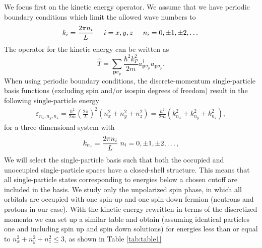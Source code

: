 We focus first on the kinetic energy operator.  We assume that we have
periodic boundary conditions which limit the allowed wave numbers to
\[
k_i=\frac{2\pi n_i}{L}\hspace{0.5cm} i=x,y,z \hspace{0.5cm} n_i=0,\pm
1,\pm 2, \dots
\]
The operator for the kinetic energy can be written as
\[
\hat{T}=\sum_{\mathbf{p}\sigma_p}\frac{\hbar^2k_P^2}{2m}a_{\mathbf{p}\sigma_p}^{\dagger}a_{\mathbf{p}\sigma_p}.
\]
When using periodic boundary conditions, the discrete-momentum
single-particle basis functions (excluding spin and/or isospin degrees
of freedom) result in the following single-particle energy
\begin{align}
  \varepsilon_{n_{x}, n_{y}, n_{z}} = \frac{\hbar^{2}}{2m} \left(
  \frac{2\pi }{L}\right)^{2} \left( n_{x}^{2} + n_{y}^{2} +
  n_{z}^{2}\right)=\frac{\hbar^2}{2m}\left(k_{n_x}^2+k_{n_y}^2+k_{n_z}^2\right),
\end{align} 
for a three-dimensional system with
\[
k_{n_i}=\frac{2\pi n_i}{L} \hspace{0.1cm} n_i = 0, \pm 1, \pm 2,
\dots,
\]
We will select the single-particle basis such that both the occupied
and unoccupied single-particle spaces have a closed-shell
structure. This means that all single-particle states corresponding to
energies below a chosen cutoff are included in the basis. We study
only the unpolarized spin phase, in which all orbitals are occupied
with one spin-up and one spin-down fermion (neutrons and protons in
our case).  With the kinetic energy rewritten in terms of the
discretized momenta we can set up a similar table and obtain (assuming
identical particles one and including spin up and spin down solutions)
for energies less than or equal to $n_{x}^{2}+n_{y}^{2}+n_{z}^{2}\le
3$, as shown in Table \ref{tab:table1}
